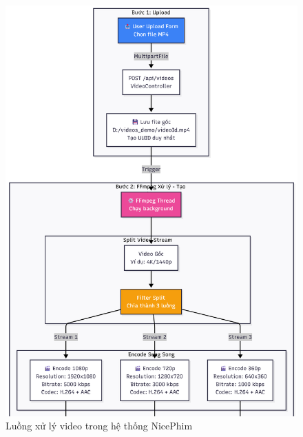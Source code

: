 \begin{figure}[H]
	\centering
	\includegraphics[width=1\textwidth]{image/mermaid/luongxulyvideo.png}
	\caption{Luồng xử lý video trong hệ thống NicePhim}
	\label{fig:luongxulyvideo}
\end{figure}


